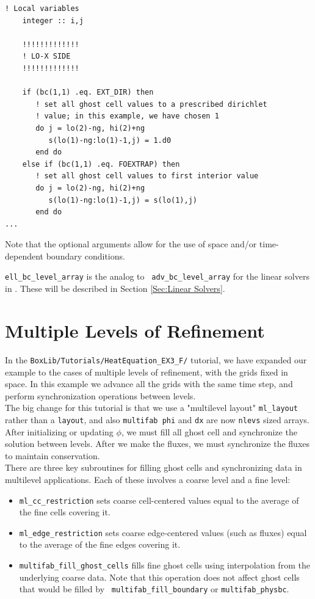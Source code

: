 \begin{lstlisting}[backgroundcolor=\color{light-green}]
    ! Local variables
    integer :: i,j

    !!!!!!!!!!!!!
    ! LO-X SIDE
    !!!!!!!!!!!!!

    if (bc(1,1) .eq. EXT_DIR) then
       ! set all ghost cell values to a prescribed dirichlet
       ! value; in this example, we have chosen 1
       do j = lo(2)-ng, hi(2)+ng
          s(lo(1)-ng:lo(1)-1,j) = 1.d0
       end do
    else if (bc(1,1) .eq. FOEXTRAP) then
       ! set all ghost cell values to first interior value
       do j = lo(2)-ng, hi(2)+ng
          s(lo(1)-ng:lo(1)-1,j) = s(lo(1),j)
       end do
...
\end{lstlisting}

Note that the optional arguments allow for the use of space and/or
time-dependent boundary conditions.

{\tt ell\_bc\_level\_array} is the analog to {\tt
  adv\_bc\_level\_array} for the linear solvers in \BoxLib.  These
will be described in Section \ref{Sec:Linear Solvers}.

\section{Multiple Levels of Refinement}\label{Sec:Refinement}
In the {\tt BoxLib/Tutorials/HeatEquation\_EX3\_F/} tutorial, we have
expanded our example to the cases of multiple levels of refinement,
with the grids fixed in space.  In this example we advance all the
grids with the same time step, and perform synchronization operations
between levels.\\

The big change for this tutorial is that we use a "multilevel layout"
{\tt ml\_layout} rather than a {\tt layout}, and also {\tt multifab
  phi} and {\tt dx} are now {\tt nlevs} sized arrays.  After
initializing or updating $\phi$, we must fill all ghost cell and
synchronize the solution between levels.  After we make the fluxes, we
must synchronize the fluxes to maintain conservation.\\

There are three key subroutines for filling ghost cells and
synchronizing data in multilevel applications.  Each of these involves
a coarse level and a fine level:
\begin{itemize}

\item {\tt ml\_cc\_restriction} sets coarse cell-centered values equal
  to the average of the fine cells covering it.

\item {\tt ml\_edge\_restriction} sets coarse edge-centered values
  (such as fluxes) equal to the average of the fine edges covering it.

\item {\tt multifab\_fill\_ghost\_cells} fills fine ghost cells using
  interpolation from the underlying coarse data.  Note that this
  operation does not affect ghost cells that would be filled by {\tt
    multifab\_fill\_boundary} or {\tt multifab\_physbc}.

\end{itemize}

